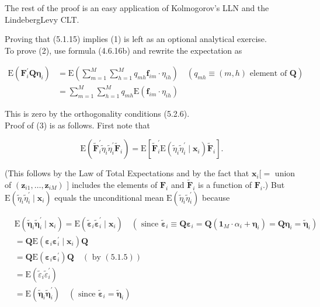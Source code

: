\documentclass[10pt]{article}
\begin{document}
The rest of the proof is an easy application of Kolmogorov's LLN and the LindebergLevy CLT.

Proving that (5.1.15) implies (1) is left as an optional analytical exercise.\\
To prove (2), use formula (4.6.16b) and rewrite the expectation as


\begin{align*}
\mathrm{E}\left(\mathbf{F}_{i}^{\prime} \mathbf{Q} \boldsymbol{\eta}_{i}\right) & =\mathrm{E}\left(\sum_{m=1}^{M} \sum_{h=1}^{M} q_{m h} \mathbf{f}_{i m} \cdot \eta_{i h}\right) \quad\left(q_{m h} \equiv(m, h) \text { element of } \mathbf{Q}\right) \\
& =\sum_{m=1}^{M} \sum_{h=1}^{M} q_{m h} \mathrm{E}\left(\mathbf{f}_{i m} \cdot \eta_{i h}\right) \tag{5.2.10}
\end{align*}


This is zero by the orthogonality conditions (5.2.6).\\
Proof of (3) is as follows. First note that

$$
\mathrm{E}\left(\widetilde{\mathbf{F}}_{i}^{\prime} \tilde{\eta}_{i} \tilde{\eta}_{i}^{\prime} \widetilde{\mathbf{F}}_{i}\right)=\mathrm{E}\left[\widetilde{\mathbf{F}}_{i}^{\prime} \mathrm{E}\left(\tilde{\eta}_{i} \tilde{\eta}_{i}^{\prime} \mid \mathbf{x}_{i}\right) \widetilde{\mathbf{F}}_{i}\right] .
$$

(This follows by the Law of Total Expectations and by the fact that $\mathbf{x}_{i}[=$ union of $\left(\mathbf{z}_{i 1}, \ldots, \mathbf{z}_{i M}\right)$ ] includes the elements of $\mathbf{F}_{i}$ and $\widetilde{\mathbf{F}}_{i}$ is a function of $\mathbf{F}_{i}$.) But $\mathrm{E}\left(\tilde{\eta}_{i} \tilde{\eta}_{i}^{\prime} \mid \mathbf{x}_{i}\right)$ equals the unconditional mean $\mathrm{E}\left(\tilde{\eta}_{i} \tilde{\eta}_{i}^{\prime}\right)$ because


\begin{align*}
& \mathrm{E}\left(\tilde{\boldsymbol{\eta}}_{i} \tilde{\boldsymbol{\eta}}_{i}^{\prime} \mid \mathbf{x}_{i}\right)=\mathrm{E}\left(\tilde{\boldsymbol{\varepsilon}}_{i} \tilde{\boldsymbol{\varepsilon}}_{i}^{\prime} \mid \mathbf{x}_{i}\right) \quad\left(\text { since } \tilde{\boldsymbol{\varepsilon}}_{i} \equiv \mathbf{Q} \boldsymbol{\varepsilon}_{i}=\mathbf{Q}\left(\mathbf{1}_{M} \cdot \alpha_{i}+\boldsymbol{\eta}_{i}\right)=\mathbf{Q} \boldsymbol{\eta}_{i}=\tilde{\boldsymbol{\eta}}_{i}\right) \\
& =\mathbf{Q} \mathrm{E}\left(\boldsymbol{\varepsilon}_{i} \boldsymbol{\varepsilon}_{i}^{\prime} \mid \mathbf{x}_{i}\right) \mathbf{Q} \\
& =\mathbf{Q} \mathrm{E}\left(\boldsymbol{\varepsilon}_{i} \boldsymbol{\varepsilon}_{i}^{\prime}\right) \mathbf{Q} \quad(\text { by }(5.1 .5)) \\
& =\mathrm{E}\left(\tilde{\varepsilon}_{i} \tilde{\varepsilon}_{i}^{\prime}\right) \\
& =\mathrm{E}\left(\tilde{\boldsymbol{\eta}}_{i} \tilde{\boldsymbol{\eta}}_{i}^{\prime}\right) \quad\left(\text { since } \tilde{\boldsymbol{\varepsilon}}_{i}=\tilde{\boldsymbol{\eta}}_{i}\right) \tag{5.2.11}
\end{align*}
\end{document}
